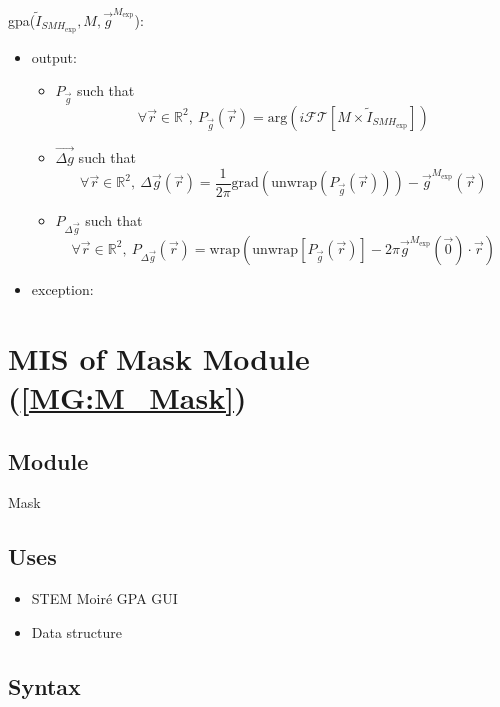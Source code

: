 \documentclass[12pt, titlepage]{article}
\begin{document}
\noindent gpa($\widetilde{I}_{\mathit{SMH}_{\text{exp}}},M,\overrightarrow{g}^{M_{\text{exp}}}$):
\begin{itemize} 
\item output: 
\begin{itemize}
	\item $P_{\vec{g}}$ such that
	\begin{equation*}
	\forall \vec{r} \in \mathbb{R}^2, \ P_{\vec{g}}(\vec{r})=\text{arg}(i\mathcal{FT}[M\times\widetilde{I}_{\mathit{SMH}_{\text{exp}}}])
	\end{equation*}
	\item $\overrightarrow{\Delta g}$ such that
	\begin{equation*}
	\forall \vec{r} \in \mathbb{R}^2, \ \Delta \overrightarrow{g}(\vec{r})=\frac{1}{2\pi}\text{grad}(\text{unwrap}(P_{\vec{g}}(\vec{r})))-\overrightarrow{g}^{M_{\text{exp}}}(\vec{r})
	\end{equation*}
	\item $P_{\Delta \vec{g}}$ such that
	\begin{equation*}
	\forall \vec{r} \in \mathbb{R}^2, \ P_{\Delta \vec{g}}(\vec{r})=\text{wrap}(\text{unwrap}[P_{\vec{g}}(\vec{r})]-2\pi\overrightarrow{g}^{M_{\text{exp}}}(\vec{0})\cdot \vec{r})
	\end{equation*}
\end{itemize}
\item exception:  
\end{itemize}

\section{MIS of Mask Module (\texorpdfstring{\cref{MG:M_Mask}}))} \label{MIS_Mask}

\subsection{Module}
Mask
\subsection{Uses}
\begin{itemize}
\item STEM Moir{\'e} GPA GUI
\item Data structure
\end{itemize}

\subsection{Syntax}
\end{document}
